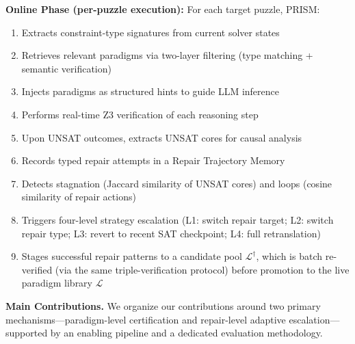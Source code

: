 \textbf{Online Phase (per-puzzle execution):} For each target puzzle, PRISM:
\begin{enumerate}
    \item Extracts constraint-type signatures from current solver states
    \item Retrieves relevant paradigms via two-layer filtering (type matching + semantic verification)
    \item Injects paradigms as structured hints to guide LLM inference
    \item Performs real-time Z3 verification of each reasoning step
    \item Upon UNSAT outcomes, extracts UNSAT cores for causal analysis
    \item Records typed repair attempts in a Repair Trajectory Memory
    \item Detects stagnation (Jaccard similarity of UNSAT cores) and loops (cosine similarity of repair actions)
    \item Triggers four-level strategy escalation (L1: switch repair target; L2: switch repair type; L3: revert to recent SAT checkpoint; L4: full retranslation)
    \item Stages successful repair patterns to a candidate pool $\mathcal{L}^{\dagger}$, which is batch re-verified (via the same triple-verification protocol) before promotion to the live paradigm library $\mathcal{L}$
\end{enumerate}

\textbf{Main Contributions.} We organize our contributions around two primary mechanisms—paradigm-level certification and repair-level adaptive escalation—supported by an enabling pipeline and a dedicated evaluation methodology.

